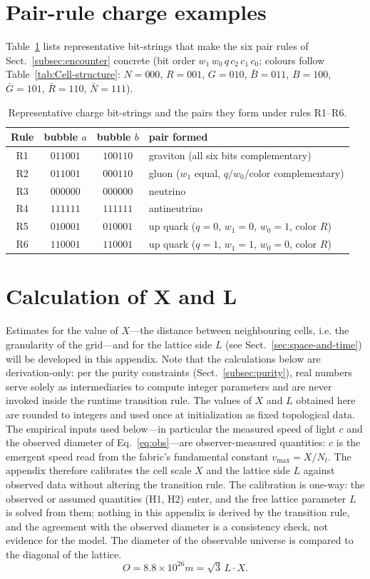 \documentclass{ijuc}
\begin{document}
\section{Pair-rule charge examples}\label{app:charge-examples}
Table~\ref{tab:charge-examples} lists representative bit-strings that make
the six pair rules of Sect.~\ref{subsec:encounter} concrete (bit order
$w_{1}\,w_{0}\,q\,c_{2}\,c_{1}\,c_{0}$; colours follow
Table~\ref{tab:Cell-structure}: $N=000$, $R=001$, $G=010$, $\bar{B}=011$,
$B=100$, $\bar{G}=101$, $\bar{R}=110$, $\bar{N}=111$).
\begin{table}[h]
\centering
\caption{Representative charge bit-strings and the pairs they form under rules R1--R6.}
\label{tab:charge-examples}
\begin{tabular}{|c|c|c|l|}
\hline
Rule & bubble $a$ & bubble $b$ & pair formed\\
\hline
R1 & $011001$ & $100110$ & graviton (all six bits complementary)\\
R2 & $011001$ & $000110$ & gluon ($w_1$ equal, $q/w_0$/color complementary)\\
R3 & $000000$ & $000000$ & neutrino\\
R4 & $111111$ & $111111$ & antineutrino\\
R5 & $010001$ & $010001$ & up quark ($q{=}0$, $w_1{=}0$, $w_0{=}1$, color $R$)\\
R6 & $110001$ & $110001$ & up quark ($q{=}1$, $w_1{=}1$, $w_0{=}0$, color $R$)\\
\hline
\end{tabular}
\end{table}
\section{Calculation of X and L\label{sec:Calculation-of-X}}
Estimates for the value of $X$---the distance between neighbouring cells, i.e. the granularity of the grid---and for the lattice side $L$ (see Sect.~\ref{sec:space-and-time}) will be developed in this appendix.
Note that the calculations below are derivation-only: per the purity constraints (Sect.~\ref{subsec:purity}), real numbers serve solely as intermediaries to compute integer parameters and are never invoked inside the runtime transition rule.  The values of $X$ and $L$ obtained here are rounded to integers and used once at initialization as fixed topological data.
The empirical inputs used below---in particular the measured speed of light $c$ and the observed diameter of Eq.~\eqref{eq:obs}---are observer-measured quantities: $c$ is the emergent speed read from the fabric's fundamental constant $v_{\max}=X/N_t$. The appendix therefore calibrates the cell scale $X$ and the lattice side $L$ against observed data without altering the transition rule.  The calibration is one-way: the observed or assumed quantities (H1, H2) enter, and the free lattice parameter $L$ is solved from them; nothing in this appendix is derived by the transition rule, and the agreement with the observed diameter is a consistency check, not evidence for the model.
The diameter of the observable universe \cite{halpbern} is compared
to the diagonal of the lattice.
\begin{equation}
O=8.8\times10^{26}m=\sqrt{3}\,L\cdot X.\label{eq:obs}
\end{equation}
\end{document}
